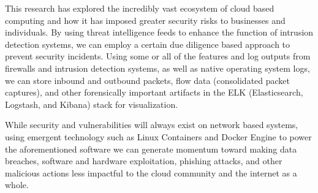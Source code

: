 \documentclass[./main.tex]{subfiles}
\begin{document}
This research has explored the incredibly vast ecosystem of cloud based computing and how it has imposed greater security risks to businesses and individuals. By using threat intelligence feeds to enhance the function of intrusion detection systems, we can employ a certain due diligence based approach to prevent security incidents. Using some or all of the features and log outputs from firewalls and intrusion detection systems, as well as native operating system logs, we can store inbound and outbound packets, flow data (consolidated packet captures), and other forensically important artifacts in the ELK (Elasticsearch, Logstash, and Kibana) stack for visualization.

While security and vulnerabilities will always exist on network based systems, using emergent technology such as Linux Containers and Docker Engine to power the aforementioned software we can generate momentum toward making data breaches, software and hardware exploitation, phishing attacks, and other malicious actions less impactful to the cloud community and the internet as a whole.
\end{document}
